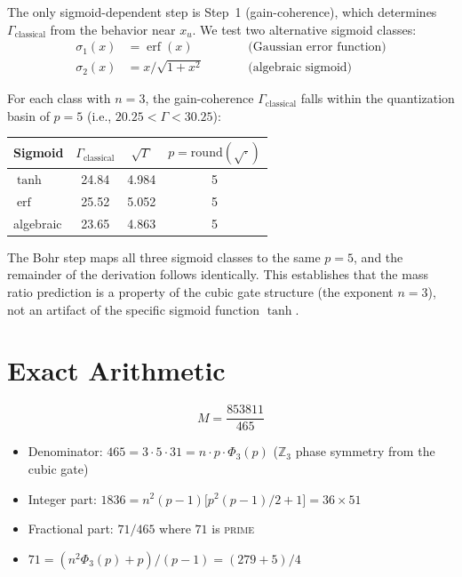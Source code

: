 \documentclass[12pt,a4paper]{article}
\theoremstyle{definition}
\newcommand{\Phithree}{\Phi_3}
\begin{document}
The only sigmoid-dependent step is Step~1 (gain-coherence), which
determines $\Gamma_\mathrm{classical}$ from the behavior near $x_u$. We
test two alternative sigmoid classes:
\begin{align*}
  \sigma_1(x) &= \operatorname{erf}(x) &\qquad&\text{(Gaussian error function)} \\
  \sigma_2(x) &= x/\sqrt{1 + x^2} &\qquad&\text{(algebraic sigmoid)}
\end{align*}

For each class with $n = 3$, the gain-coherence $\Gamma_\mathrm{classical}$
falls within the quantization basin of $p = 5$ (i.e.,
$20.25 < \Gamma < 30.25$):

\begin{center}
\begin{tabular}{lccc}
\toprule
Sigmoid & $\Gamma_\mathrm{classical}$ & $\sqrt{\Gamma}$ & $p = \mathrm{round}(\sqrt{\cdot})$ \\
\midrule
$\tanh$     & 24.84 & 4.984 & 5 \\
$\operatorname{erf}$ & 25.52 & 5.052 & 5 \\
algebraic   & 23.65 & 4.863 & 5 \\
\bottomrule
\end{tabular}
\end{center}

The Bohr step maps all three sigmoid classes to the same $p = 5$, and
the remainder of the derivation follows identically. This establishes
that the mass ratio prediction is a property of the cubic gate structure
(the exponent $n = 3$), not an artifact of the specific sigmoid
function $\tanh$.

\section{Exact Arithmetic}

\[
  M = \frac{853811}{465}
\]
\begin{itemize}
  \item Denominator: $465 = 3 \cdot 5 \cdot 31 = n \cdot p \cdot \Phithree(p)$
        ($\mathbb{Z}_3$ phase symmetry from the cubic gate)
  \item Integer part: $1836 = n^2(p-1)\bigl[p^2(p-1)/2 + 1\bigr] = 36 \times 51$
  \item Fractional part: $71/465$ where $71$ is \textsc{prime}
  \item $71 = (n^2 \Phithree(p) + p)/(p-1) = (279 + 5)/4$
\end{itemize}
\end{document}
